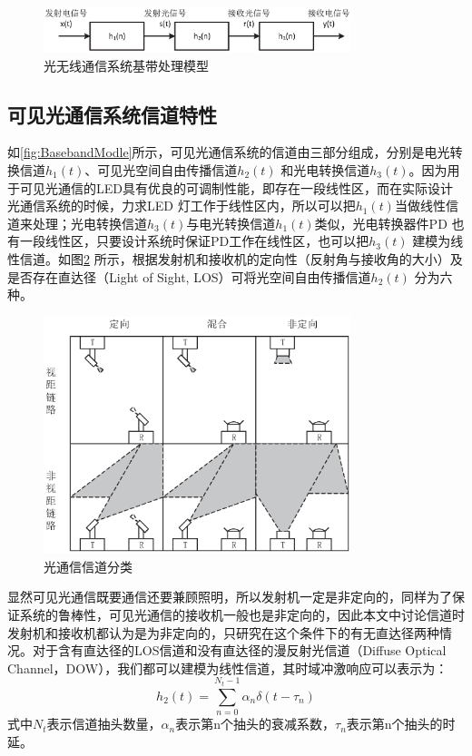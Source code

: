 \begin{figure}[htbp]
\centering
\includegraphics[width=0.8\textwidth]{figures/chapter-2/BasebandModle.eps}
\caption{光无线通信系统基带处理模型}
\label{fig:BasebandModle}
\end{figure}

\subsection{可见光通信系统信道特性}\label{subsection:Channel}
如\autoref{fig:BasebandModle}所示，可见光通信系统的信道由三部分组成，分别是电光转换信道$h_1(t)$、可见光空间自由传播信道$h_2(t)$ 和光电转换信道$h_3(t)$。因为用于可见光通信的LED具有优良的可调制性能，即存在一段线性区，而在实际设计光通信系统的时候，力求LED 灯工作于线性区内，所以可以把$h_1(t)$当做线性信道来处理；光电转换信道$h_3(t)$与电光转换信道$h_1(t)$类似，光电转换器件PD 也有一段线性区，只要设计系统时保证PD工作在线性区，也可以把$h_3(t)$ 建模为线性信道。如图\ref{fig:ChannelClass} 所示，根据发射机和接收机的定向性（反射角与接收角的大小）及是否存在直达径（Light of Sight, LOS）可将光空间自由传播信道$h_2(t)$ 分为六种。
\begin{figure}[htbp]
\centering
\includegraphics[width=0.8\textwidth]{figures/chapter-2/ChannelClass.eps}
\caption{光通信信道分类}
\label{fig:ChannelClass}
\end{figure}
显然可见光通信既要通信还要兼顾照明，所以发射机一定是非定向的，同样为了保证系统的鲁棒性，可见光通信的接收机一般也是非定向的，因此本文中讨论信道时发射机和接收机都认为是为非定向的，只研究在这个条件下的有无直达径两种情况。对于含有直达径的LOS信道和没有直达径的漫反射光信道（Diffuse Optical Channel，DOW），我们都可以建模为线性信道，其时域冲激响应可以表示为：
\begin{equation}
\label{equ:opticalChannelMode}
h_2(t) = \sum_{n=0}^{N_t-1}\alpha_n \delta(t-\tau_n)
\end{equation}
式中$N_t$表示信道抽头数量，$\alpha_n$表示第n个抽头的衰减系数，$\tau_n$表示第n个抽头的时延。

